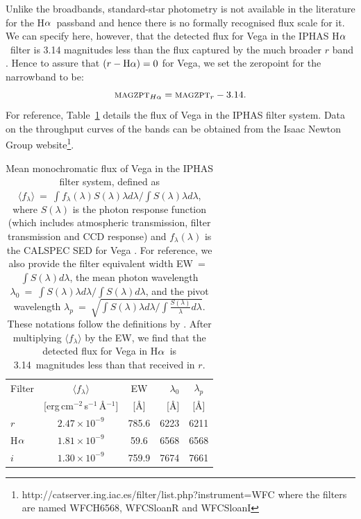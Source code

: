 \documentclass[a4paper,useAMS,usenatbib]{mn2e}
\def\ha{\mbox{H$\rm \alpha$}}
\begin{document}
Unlike the broadbands, 
standard-star photometry is not available in the literature 
for the \ha\ passband
and hence there is no formally recognised flux scale for it.
We can specify here, however, 
that the detected flux for Vega in the
IPHAS \ha\ filter is 3.14 magnitudes
less than the flux captured by the much broader
$r$ band \citep{Gonzalez-Solares2008}.
Hence to assure that $(r-\ha)=0$ for Vega,
we set the zeropoint for the narrowband to be:
\begin{equation}
\textsc{magzpt}_{H\alpha} = \textsc{magzpt}_r - 3.14.
\label{eqn:zpha}
\end{equation}
For reference, Table~\ref{tbl:flux} details the flux of Vega
in the IPHAS filter system.
Data on the throughput curves of the bands can be obtained from
the Isaac Newton Group website\footnote{http://catserver.ing.iac.es/filter/list.php?instrument=WFC where the
filters are named WFCH6568, WFCSloanR and WFCSloanI}.

\begin{table}
    \caption{Mean monochromatic flux of Vega in the IPHAS filter system,
             defined as 
             $\langle f_\lambda\rangle~=~\int{f_\lambda(\lambda) S(\lambda) \lambda d \lambda} / \int{S(\lambda)\lambda d \lambda}$,
             where $S(\lambda)$ is the photon response function 
             (which includes atmospheric transmission,
             filter transmission
             and CCD response)
             and $f_\lambda(\lambda)$ is the CALSPEC SED for Vega
             \citep{Bohlin2014}.
             For reference, we also provide the 
             filter equivalent width EW~=~$\int S(\lambda) d\lambda$,
             the mean photon wavelength 
             $\lambda_0~=~\int{S(\lambda)\lambda d\lambda} / \int{S(\lambda)d\lambda}$,
             and the pivot wavelength
             $\lambda_p~=~\sqrt{\int{S(\lambda)\lambda d\lambda} / \int{\frac{S(\lambda)}{\lambda} d\lambda}}$.
             These notations follow the definitions by \citet{Bessell2012}.
             After multiplying $\langle f_\lambda\rangle$ by the EW,
             we find that the detected flux for Vega in \ha\ is 3.14~magnitudes less
             than that received in $r$.
          }
    \label{tbl:flux}
    \begin{center}
    \begin{tabular}{lccrc}
    \toprule
     Filter  & $\langle f_\lambda \rangle$  & \multicolumn{1}{c}{EW} &$\lambda_0$ & $\lambda_p$    \\
             & [erg\,cm$^{-2}$\,s$^{-1}$\,\AA$^{-1}$] & [\AA] & [\AA] & [\AA] \\
    \midrule
$r$ &  $2.47 \times 10^{-9}$  &  785.6 &  6223  &   6211   \\
\ha &  $1.81 \times 10^{-9}$ &   59.6 &  6568  &   6568    \\
$i$  &  $1.30 \times 10^{-9}$  &  759.9  &  7674  &   7661   \\
    \bottomrule
    \end{tabular}
    \end{center}
\end{table}
\end{document}
